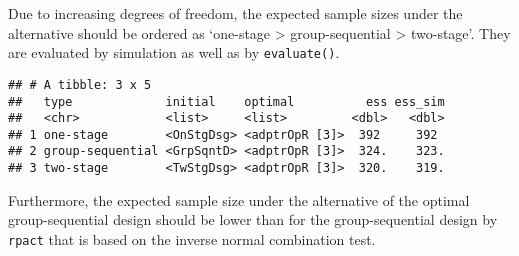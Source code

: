 \documentclass[
]{book}
\newenvironment{Shaded}{\begin{snugshade}}{\end{snugshade}}
\newcommand{\AttributeTok}[1]{\textcolor[rgb]{0.77,0.63,0.00}{#1}}
\newcommand{\CommentTok}[1]{\textcolor[rgb]{0.56,0.35,0.01}{\textit{#1}}}
\newcommand{\DecValTok}[1]{\textcolor[rgb]{0.00,0.00,0.81}{#1}}
\newcommand{\FunctionTok}[1]{\textcolor[rgb]{0.00,0.00,0.00}{#1}}
\newcommand{\NormalTok}[1]{#1}
\newcommand{\SpecialCharTok}[1]{\textcolor[rgb]{0.00,0.00,0.00}{#1}}
\begin{document}
Due to increasing degrees of freedom, the expected sample sizes under the
alternative should be ordered as `one-stage \textgreater{} group-sequential \textgreater{} two-stage'.
They are evaluated by simulation as well as by \texttt{evaluate()}.

\begin{Shaded}
\end{Shaded}

\begin{verbatim}
## # A tibble: 3 x 5
##   type             initial    optimal          ess ess_sim
##   <chr>            <list>     <list>         <dbl>   <dbl>
## 1 one-stage        <OnStgDsg> <adptrOpR [3]>  392     392 
## 2 group-sequential <GrpSqntD> <adptrOpR [3]>  324.    323.
## 3 two-stage        <TwStgDsg> <adptrOpR [3]>  320.    319.
\end{verbatim}

Furthermore, the expected sample size under the alternative of the
optimal group-sequential design should be lower than for the
group-sequential design by \texttt{rpact} that is based on the inverse normal
combination test.
\end{document}
